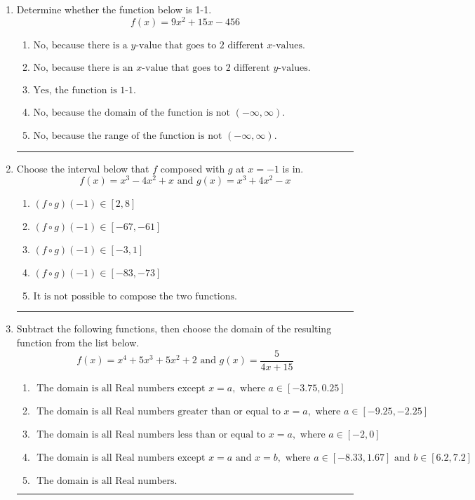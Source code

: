 \documentclass[14pt]{extbook}
\newcommand{\litem}[1]{\item#1\hspace*{-1cm}\rule{\textwidth}{0.4pt}}
\begin{document}
\begin{enumerate}
\litem{
Determine whether the function below is 1-1.\[ f(x) = 9 x^2 + 15 x - 456 \]\begin{enumerate}[label=\Alph*.]
\item \( \text{No, because there is a $y$-value that goes to 2 different $x$-values.} \)
\item \( \text{No, because there is an $x$-value that goes to 2 different $y$-values.} \)
\item \( \text{Yes, the function is 1-1.} \)
\item \( \text{No, because the domain of the function is not $(-\infty, \infty)$.} \)
\item \( \text{No, because the range of the function is not $(-\infty, \infty)$.} \)

\end{enumerate} }
\litem{
Choose the interval below that $f$ composed with $g$ at $x=-1$ is in.\[ f(x) = x^{3} -4 x^{2} +x \text{ and } g(x) = x^{3} +4 x^{2} -x \]\begin{enumerate}[label=\Alph*.]
\item \( (f \circ g)(-1) \in [2, 8] \)
\item \( (f \circ g)(-1) \in [-67, -61] \)
\item \( (f \circ g)(-1) \in [-3, 1] \)
\item \( (f \circ g)(-1) \in [-83, -73] \)
\item \( \text{It is not possible to compose the two functions.} \)

\end{enumerate} }
\litem{
Subtract the following functions, then choose the domain of the resulting function from the list below.\[ f(x) = x^{4} +5 x^{3} +5 x^{2} + 2 \text{ and } g(x) = \frac{5}{4x+15} \]\begin{enumerate}[label=\Alph*.]
\item \( \text{ The domain is all Real numbers except } x = a, \text{ where } a \in [-3.75, 0.25] \)
\item \( \text{ The domain is all Real numbers greater than or equal to } x = a, \text{ where } a \in [-9.25, -2.25] \)
\item \( \text{ The domain is all Real numbers less than or equal to } x = a, \text{ where } a \in [-2, 0] \)
\item \( \text{ The domain is all Real numbers except } x = a \text{ and } x = b, \text{ where } a \in [-8.33, 1.67] \text{ and } b \in [6.2, 7.2] \)
\item \( \text{ The domain is all Real numbers. } \)


\end{enumerate}}
\end{enumerate}
\end{document}
